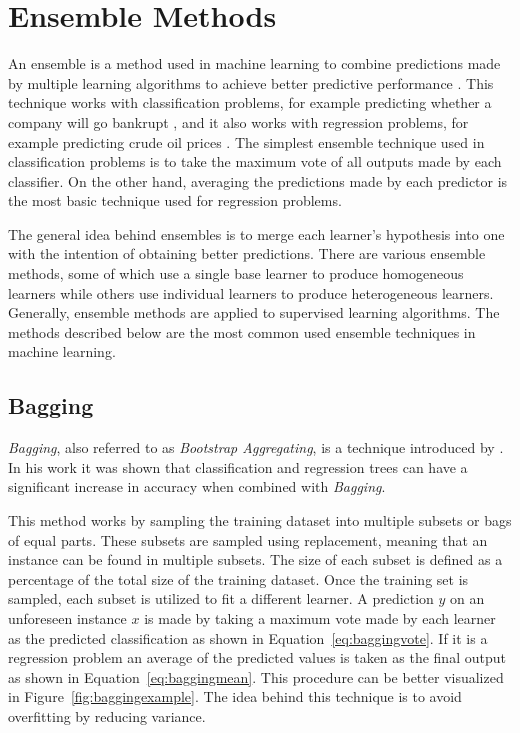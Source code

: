 \chapter{Ensemble Methods}\label{ch:ensemble-methods}


An ensemble is a method used in machine learning to combine predictions made by multiple learning algorithms to achieve better predictive performance \citep{clemen1989combining, perrone1993improving}. This technique works with classification problems, for example predicting whether a company will go bankrupt \citep{zikeba2016ensemble}, and it also works with regression problems, for example predicting crude oil prices \citep{yu2008forecasting}. The simplest ensemble technique used in classification problems is to take the maximum vote of all outputs made by each classifier. On the other hand, averaging the predictions made by each predictor is the most basic technique used for regression problems.   

The general idea behind ensembles is to merge each learner's hypothesis into one with the intention of obtaining better predictions. There are various ensemble methods, some of which use a single base learner to produce homogeneous learners while others use individual learners to produce heterogeneous learners. Generally, ensemble methods are applied to supervised learning algorithms. The methods described below are the most common used ensemble techniques in machine learning.

\section{Bagging}
\textit{Bagging}, also referred to as \textit{Bootstrap Aggregating}, is a technique introduced by \citet{breiman1996bagging}. In his work it was shown that classification and regression trees \citep{breiman1993classification} can have a significant increase in accuracy when combined with \textit{Bagging}. 

This method works by sampling the training dataset into multiple subsets or bags of equal parts. These subsets are sampled using replacement, meaning that an instance can be found in multiple subsets. The size of each subset is defined as a percentage of the total size of the training dataset. Once the training set is sampled, each subset is utilized to fit a different learner. A prediction $\hat{y}$ on an unforeseen instance $x$ is made by taking a maximum vote made by each learner as the predicted classification as shown in Equation~\ref{eq:baggingvote}. If it is a regression problem an average of the predicted values is taken as the final output as shown in Equation~\ref{eq:baggingmean}. This procedure can be better visualized in Figure~\ref{fig:baggingexample}. The idea behind this technique is to avoid overfitting by reducing variance.

